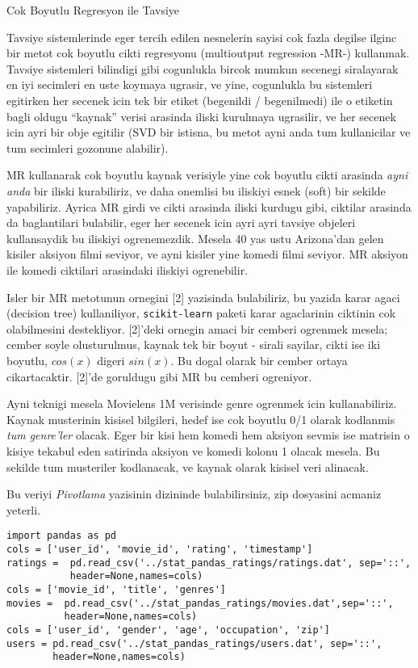 \documentclass[12pt,fleqn]{article}\usepackage{../common}
\begin{document}
Cok Boyutlu Regresyon ile Tavsiye

Tavsiye sistemlerinde eger tercih edilen nesnelerin sayisi cok fazla
degilse ilginc bir metot cok boyutlu cikti regresyonu (multioutput
regression -MR-) kullanmak. Tavsiye sistemleri bilindigi gibi cogunlukla
bircok mumkun secenegi siralayarak en iyi secimleri en uste koymaya
ugrasir, ve yine, cogunlukla bu sistemleri egitirken her secenek icin tek
bir etiket (begenildi / begenilmedi) ile o etiketin bagli oldugu ``kaynak''
verisi arasinda iliski kurulmaya ugrasilir, ve her secenek icin ayri bir
obje egitilir (SVD bir istisna, bu metot ayni anda tum kullanicilar ve tum
secimleri gozonune alabilir).

MR kullanarak cok boyutlu kaynak verisiyle yine cok boyutlu cikti arasinda
{\em ayni anda} bir iliski kurabiliriz, ve daha onemlisi bu iliskiyi esnek
(soft) bir sekilde yapabiliriz. Ayrica MR girdi ve cikti arasinda iliski
kurdugu gibi, ciktilar arasinda da baglantilari bulabilir, eger her secenek
icin ayri ayri tavsiye objeleri kullansaydik bu iliskiyi
ogrenemezdik. Mesela 40 yas ustu Arizona'dan gelen kisiler aksiyon filmi
seviyor, ve ayni kisiler yine komedi filmi seviyor. MR aksiyon ile komedi
ciktilari arasindaki iliskiyi ogrenebilir.

Isler bir MR metotunun ornegini [2] yazisinda bulabiliriz, bu yazida karar
agaci (decision tree) kullaniliyor, \verb!scikit-learn! paketi karar
agaclarinin ciktinin cok olabilmesini destekliyor. [2]'deki ornegin amaci
bir cemberi ogrenmek mesela; cember soyle olusturulmus, kaynak tek bir
boyut - sirali sayilar, cikti ise iki boyutlu, $cos(x)$ digeri $sin(x)$. Bu
dogal olarak bir cember ortaya cikartacaktir. [2]'de goruldugu gibi MR bu
cemberi ogreniyor.

Ayni teknigi mesela Movielens 1M verisinde genre ogrenmek icin
kullanabiliriz. Kaynak musterinin kisisel bilgileri, hedef ise cok boyutlu
0/1 olarak kodlanmis {\em tum genre'ler} olacak. Eger bir kisi hem komedi
hem aksiyon sevmis ise matrisin o kisiye tekabul eden satirinda aksiyon ve
komedi kolonu 1 olacak mesela. Bu sekilde tum musteriler kodlanacak, ve
kaynak olarak kisisel veri alinacak. 

Bu veriyi {\em Pivotlama} yazisinin dizininde bulabilirsiniz, zip dosyasini
acmaniz yeterli. 

\begin{verbatim}
import pandas as pd
cols = ['user_id', 'movie_id', 'rating', 'timestamp']
ratings =  pd.read_csv('../stat_pandas_ratings/ratings.dat', sep='::',
           header=None,names=cols)
cols = ['movie_id', 'title', 'genres']
movies =  pd.read_csv('../stat_pandas_ratings/movies.dat',sep='::',
          header=None,names=cols)
cols = ['user_id', 'gender', 'age', 'occupation', 'zip']
users = pd.read_csv('../stat_pandas_ratings/users.dat', sep='::', 
        header=None,names=cols)
\end{verbatim}
\end{document}
